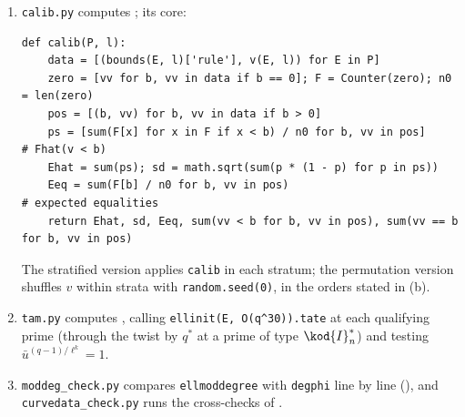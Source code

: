 \begin{sloppypar}
\begin{remark}
\begin{enumerate}[label=(\roman*)]
\begin{lstlisting}[basicstyle=\ttfamily\scriptsize]
        elif l == 3 and (abs(k) == 4 or (abs(k) == 2 and q != 2)): tw += 1
    thm = sum(e + t for _, _, e, w, t in T1)       # e = 0 at q = l: (eq:thm) as written
    return dict(rule=nc - h, nc=nc, iii=sum(e + w + t for _, _, e, w, t in T0),
                main=main, tw=tw, thm=thm)
\end{lstlisting}
Here \texttt{vl} is the $\ell$-adic valuation of a fraction, \texttt{W3} the weight of , \texttt{phig} the order of
$\Phig_q$ read off the code and \texttt{nidx} the index $n$ of $\kod{I}_n$ or $\kod{I}_n^*$. The population filter compares the prime part of each \texttt{galrep} label
exactly, and CM is decided by $j$. The tables of  are loops over the records with these functions.
\item \texttt{calib.py} computes ; its core:
\begin{lstlisting}[basicstyle=\ttfamily\scriptsize]
def calib(P, l):
    data = [(bounds(E, l)['rule'], v(E, l)) for E in P]
    zero = [vv for b, vv in data if b == 0]; F = Counter(zero); n0 = len(zero)
    pos = [(b, vv) for b, vv in data if b > 0]
    ps = [sum(F[x] for x in F if x < b) / n0 for b, vv in pos]     # Fhat(v < b)
    Ehat = sum(ps); sd = math.sqrt(sum(p * (1 - p) for p in ps))
    Eeq = sum(F[b] / n0 for b, vv in pos)                            # expected equalities
    return Ehat, sd, Eeq, sum(vv < b for b, vv in pos), sum(vv == b for b, vv in pos)
\end{lstlisting}
The stratified version applies \texttt{calib} in each stratum; the permutation version shuffles $v$ within strata with \texttt{random.seed(0)}, in the orders stated in (b).
\item \texttt{tam.py} computes , calling \texttt{ellinit(E, O(q\^{}30)).tate} at each qualifying prime (through the twist
by $q^*$ at a prime of type $\kod{I}_n^*$) and testing $\bar u^{(q-1)/\ell^k}=1$.
\item \texttt{moddeg\_check.py} compares \texttt{ellmoddegree} with \texttt{degphi} line by line (), and
\texttt{curvedata\_check.py} runs the cross-checks of .
\end{enumerate}
\end{remark}


\end{sloppypar}
